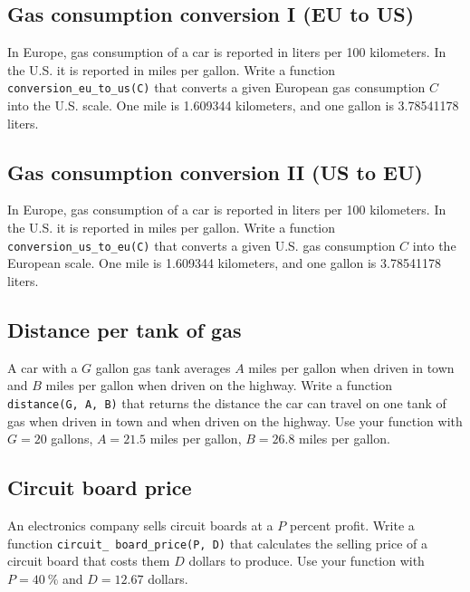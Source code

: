 \subsection{Gas consumption conversion I (EU to US)}

In Europe, gas consumption of a car is reported in liters per 100 kilometers. In the U.S. 
it is reported in miles per gallon. Write a function {\tt conversion\_eu\_to\_us(C)} that converts a given European 
gas consumption $C$ into the U.S. scale. One mile is 1.609344 kilometers, and one gallon is 3.78541178 liters. 


\subsection{Gas consumption conversion II (US to EU)}

In Europe, gas consumption of a car is reported in liters per 100 kilometers. In the U.S. 
it is reported in miles per gallon. Write a function {\tt conversion\_us\_to\_eu(C)} that converts a given U.S. gas 
consumption $C$ into the European scale. One mile is 1.609344 kilometers, and one gallon is 3.78541178 liters. 


\subsection{Distance per tank of gas}

A car with a $G$ gallon gas tank averages $A$ miles per gallon 
when driven in town and 
$B$ miles per gallon when driven on the highway. Write a function {\tt distance(G, A, B)} 
that returns the distance the car can travel on one tank of gas when driven in town and when driven on the highway. 
Use your function with $G = 20$ gallons, $A = 21.5$ miles per gallon, $B = 26.8$ miles per gallon. 


\subsection{Circuit board price}

An electronics company sells circuit boards at a $P$ percent profit. 
Write a function {\tt circuit\_ board\_price(P, D)} 
that calculates the selling price of a circuit board that costs them $D$ dollars to
produce. Use your function with $P = 40\ \%$ and $D = 12.67$ dollars.

